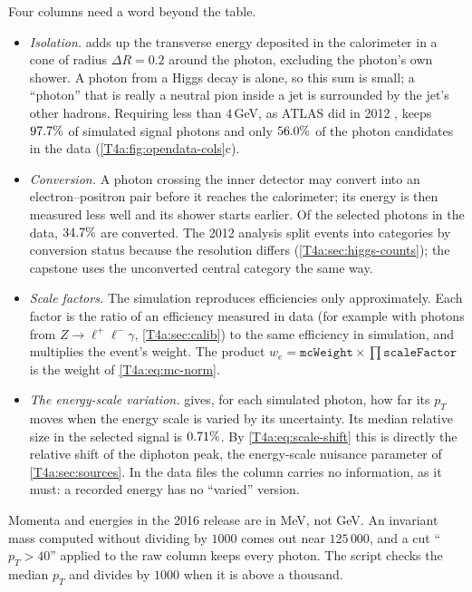 Four columns need a word beyond the table.
\begin{itemize}[itemsep=1pt,leftmargin=1.2em]
  \item \emph{Isolation.}  adds up the transverse energy deposited in the calorimeter in a cone of radius $\Delta R=0.2$ around the photon, excluding the photon's own shower. A photon from a Higgs decay is alone, so this sum is small; a ``photon'' that is really a neutral pion inside a jet is surrounded by the jet's other hadrons. Requiring less than $4$\,GeV, as ATLAS did in 2012 \cite[Sec.~5.1]{AadHiggs2012}, keeps $\tfouraR{1}{\TfdIsoMC}\%$ of simulated signal photons and only $\tfouraR{1}{\TfdIsoData}\%$ of the photon candidates in the data (\cref{T4a:fig:opendata-cols}c).
  \item \emph{Conversion.} A photon crossing the inner detector may convert into an electron--positron pair before it reaches the calorimeter; its energy is then measured less well and its shower starts earlier. Of the selected photons in the data, $\tfouraR{1}{\TfdConv}\%$ are converted. The 2012 analysis split events into categories by conversion status because the resolution differs (\cref{T4a:sec:higgs-counts}); the capstone uses the unconverted central category the same way.
  \item \emph{Scale factors.} The simulation reproduces efficiencies only approximately. Each factor is the ratio of an efficiency measured in data (for example with photons from $Z\to\ell^+\ell^-\gamma$, \cref{T4a:sec:calib}) to the same efficiency in simulation, and multiplies the event's weight. The product $w_e=\texttt{mcWeight}\times\prod\texttt{scaleFactor}$ is the weight of \eqref{T4a:eq:mc-norm}.
  \item \emph{The energy-scale variation.}  gives, for each simulated photon, how far its $p_T$ moves when the energy scale is varied by its uncertainty. Its median relative size in the selected signal is $\tfouraR{2}{\TfdSystRel}\%$. By \eqref{T4a:eq:scale-shift} this is directly the relative shift of the diphoton peak, the energy-scale nuisance parameter of \cref{T4a:sec:sources}. In the data files the column carries no information, as it must: a recorded energy has no ``varied'' version.
\end{itemize}

\begin{pitfall}
Momenta and energies in the 2016 release are in MeV, not GeV. An invariant mass computed without dividing by $1000$ comes out near $125\,000$, and a cut ``$p_T>40$'' applied to the raw column keeps every photon. The script checks the median $p_T$ and divides by $1000$ when it is above a thousand.
\end{pitfall}

